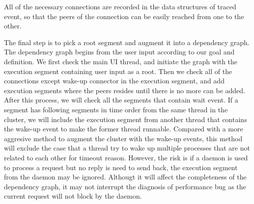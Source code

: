 All of the necessary connections are recorded in the data structures of traced event, so that the peers of the connection can be easily reached from one to the other.
\par
The final step is to pick a root segment and augment it into a dependency graph.
The dependency graph begins from the user input according to our goal and definition.
We first check the main UI thread, and initiate the graph with the execution segment containing user input as a root.
Then we check all of the connections except wake-up connector in the execution segment, and add execution segments where the peers resides until there is no more can be added.
After this process, we will check all the segments that contain wait event.
If a segment has following segments in time order from the same thread in the cluster, we will include the execution segment from another thread that contains the wake-up event to make the former thread runnable.
Compared with a more aggresive method to augment the cluster with the wake-up events, this method will exclude the case that a thread try to wake up multiple processes that are not related to each other for timeout reason.
However, the risk is if a daemon is used to process a request but no reply is need to send back, the execution segment from the daemon may be ignored.
Althougt it will affect the completeness of the dependency graph, it may not interrupt the diagnosis of performance bug as the current request will not block by the daemon.
